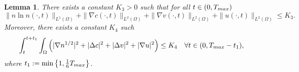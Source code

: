 \documentclass[10pt,a4paper]{amsart}
\numberwithin{equation}{section}
\newtheorem{lemma}[theo]{Lemma}
\begin{document}
\begin{lemma}\label{lem3.5}
There exists a constant $K_3>0$ such that for all $ t \in (0, T_{\rm max}) $
\begin{equation} \label{eq-3.11}
\|n \ln n (\cdot,t)\|_{L^1(\Omega)} + \|\nabla c(\cdot,t)\|_{L^2(\Omega)}
+ \|\nabla v(\cdot,t)\|_{L^2(\Omega)} + \| u(\cdot,t)\|_{L^2(\Omega)} \leq K_3.
\end{equation}
Moreover, there exists a constant $K_4$ such
\begin{equation} \label{3.18-1}
\int_{t}^{t+t_1}\int_{\Omega}\left(|\nabla n^{1/2}|^2+|\Delta c|^2+|\Delta v|^2
+|\nabla u|^2\right) \le K_4\quad \forall t\in(0,T_{\rm max}-t_1),
\end{equation}
where $t_1:=\min\left\{1,\frac{1}{6}T_{\rm max}\right\}$.
\end{lemma}
\end{document}
